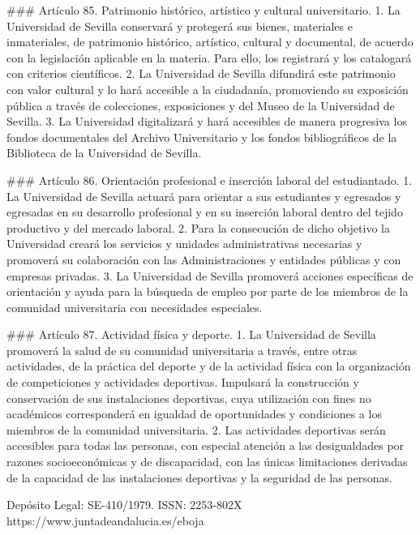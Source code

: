 \documentclass{article}
\begin{document}
\begin{itemize}
\begin{itemize}
\begin{scriptsize}
                  \#\#\# Artículo 85. Patrimonio histórico, artístico y cultural universitario.
                  1. La Universidad de Sevilla conservará y protegerá sus bienes, materiales e inmateriales, de patrimonio histórico, artístico, cultural y documental, de acuerdo con la legislación aplicable en la materia. Para ello, los registrará y los catalogará con criterios científicos.
                  2. La Universidad de Sevilla difundirá este patrimonio con valor cultural y lo hará accesible a la ciudadanía, promoviendo su exposición pública a través de colecciones, exposiciones y del Museo de la Universidad de Sevilla.
                  3. La Universidad digitalizará y hará accesibles de manera progresiva los fondos documentales del Archivo Universitario y los fondos bibliográficos de la Biblioteca de la Universidad de Sevilla.

                  \#\#\# Artículo 86. Orientación profesional e inserción laboral del estudiantado.
                  1. La Universidad de Sevilla actuará para orientar a sus estudiantes y egresados y egresadas en su desarrollo profesional y en su inserción laboral dentro del tejido productivo y del mercado laboral.
                  2. Para la consecución de dicho objetivo la Universidad creará los servicios y unidades administrativas necesarias y promoverá su colaboración con las Administraciones y entidades públicas y con empresas privadas.
                  3. La Universidad de Sevilla promoverá acciones específicas de orientación y ayuda para la búsqueda de empleo por parte de los miembros de la comunidad universitaria con necesidades especiales.

                  \#\#\# Artículo 87. Actividad física y deporte.
                  1. La Universidad de Sevilla promoverá la salud de su comunidad universitaria a través, entre otras actividades, de la práctica del deporte y de la actividad física con la organización de competiciones y actividades deportivas. Impulsará la construcción y conservación de sus instalaciones deportivas, cuya utilización con fines no académicos corresponderá en igualdad de oportunidades y condiciones a los miembros de la comunidad universitaria.
                  2. Las actividades deportivas serán accesibles para todas las personas, con especial atención a las desigualdades por razones socioeconómicas y de discapacidad, con las únicas limitaciones derivadas de la capacidad de las instalaciones deportivas y la seguridad de las personas.

                  Depósito Legal: SE-410/1979. ISSN: 2253-802X https://www.juntadeandalucia.es/eboja


\end{scriptsize}
\end{itemize}
\end{itemize}
\end{document}
